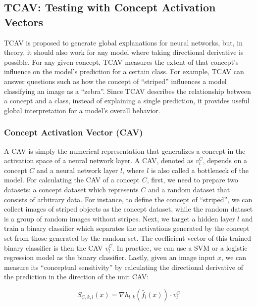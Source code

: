 \documentclass[
  10pt,
]{scrbook}
\begin{document}
\hypertarget{tcav-testing-with-concept-activation-vectors}{%
\subsection{TCAV: Testing with Concept Activation Vectors}\label{tcav-testing-with-concept-activation-vectors}}

TCAV is proposed to generate global explanations for neural networks, but, in theory, it should also work for any model where taking directional derivative is possible.
For any given concept, TCAV measures the extent of that concept's influence on the model's prediction for a certain class.
For example, TCAV can answer questions such as how the concept of ``striped'' influences a model classifying an image as a ``zebra''.
Since TCAV describes the relationship between a concept and a class, instead of explaining a single prediction, it provides useful global interpretation for a model's overall behavior.

\hypertarget{concept-activation-vector-cav}{%
\subsubsection{Concept Activation Vector (CAV)}\label{concept-activation-vector-cav}}

A CAV is simply the numerical representation that generalizes a concept in the activation space of a neural network layer.
A CAV, denoted as \(v_l^C\), depends on a concept \(C\) and a neural network layer \(l\), where \(l\) is also called a bottleneck of the model.
For calculating the CAV of a concept \(C\), first, we need to prepare two datasets: a concept dataset which represents \(C\) and a random dataset that consists of arbitrary data.
For instance, to define the concept of ``striped'', we can collect images of striped objects as the concept dataset, while the random dataset is a group of random images without stripes.
Next, we target a hidden layer \(l\) and train a binary classifier which separates the activations generated by the concept set from those generated by the random set.
The coefficient vector of this trained binary classifier is then the CAV \(v_l^C\).
In practice, we can use a SVM or a logistic regression model as the binary classifier.
Lastly, given an image input \(x\), we can measure its ``conceptual sensitivity'' by calculating the directional derivative of the prediction in the direction of the unit CAV:

\[S_{C,k,l}(x)=\nabla h_{l,k}(\hat{f}_l(x))\cdot v_l^C\]
\end{document}
